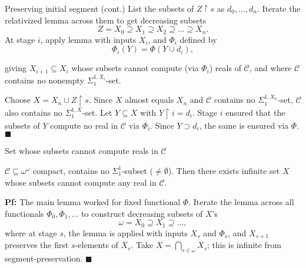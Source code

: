 \begin{frame}{Preserving initial segment (cont.)}
  List the subsets of $Z\restriction s$ as $d_0,\ldots,d_n$. Iterate the
  relativized lemma across them to get decreasing subsets
  \[Z=X_0 \supseteq X_1 \supseteq X_2 \supseteq\ldots \supseteq X_n.\]
  At stage $i$, apply lemma with inputs $X_i$, and $\Phi_i$ defined by
  \[\Phi_i(Y) =\Phi(Y\cup d_i),\]

  giving $X_{i+1}\subseteq X_i$ whose subsets cannot compute (via
  $\Phi_i$) reals of $\mathcal{C}$, and where $\mathcal{C}$ contains no
  nonempty $\Sigma_1^{1,X_i}$-set.

  \vspace{1em}
  Choose $X=X_n\cup Z\restriction s$. Since $X$ almost equals $X_n$ and
  $\mathcal{C}$ contains no $\Sigma_1^{1,X_n}$-set, $\mathcal{C}$ also
  contains no $\Sigma_1^{1,X}$-set. Let $Y\subseteq X$ with $Y\restriction
  i=d_i$. Stage $i$ ensured that the subsets of $Y$ compute no real in
  $\mathcal{C}$ via $\Phi_i$. Since $Y\supset d_i$, the same is ensured via
  $\Phi$. $\blacksquare$
\end{frame}

\begin{frame}{Set whose subsets cannot compute reals in $\mathcal{C}$}
  \begin{main-thm*}
    $\mathcal{C}\subseteq\omega^\omega$ compact, contains no
    $\Sigma_1^1$-subset ($\neq\emptyset$). Then there exists infinite set
    $X$ whose subsets cannot compute any real in $\mathcal{C}$.
  \end{main-thm*}

  \vspace{1em}
  \textbf{Pf:} The main lemma worked for fixed functional $\Phi$. Iterate
  the lemma across all functionals $\Phi_0,\Phi_1,\ldots$ to construct
  decreasing subsets of $X$'s
  \[\omega= X_0\supseteq X_1\supseteq\ldots,\]
  where at stage $s$, the lemma is applied with inputs $X_s$ and
  $\Phi_s$, and $X_{s+1}$ preserves the first $s$-elements of $X_s$. Take
  $X=\bigcap_{s\in\omega}X_s$; this is infinite from segment-preservation.
  $\blacksquare$
\end{frame}
